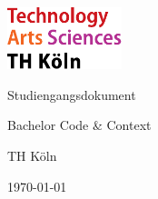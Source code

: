
\begin{titlepage}

	\includegraphics[width=0.25\textwidth]{../../../assets/logo_th_koeln.pdf}

	\vspace{2cm}
	{\Large\raggedright Studiengangsdokument\par}
	\vspace{-1cm}
	{\Huge\singlespacing Bachelor Code \& Context \par}
	\vspace{1cm}
	{\Large TH Köln\par}

	\vfill

	{\large \today\par}
\end{titlepage}
